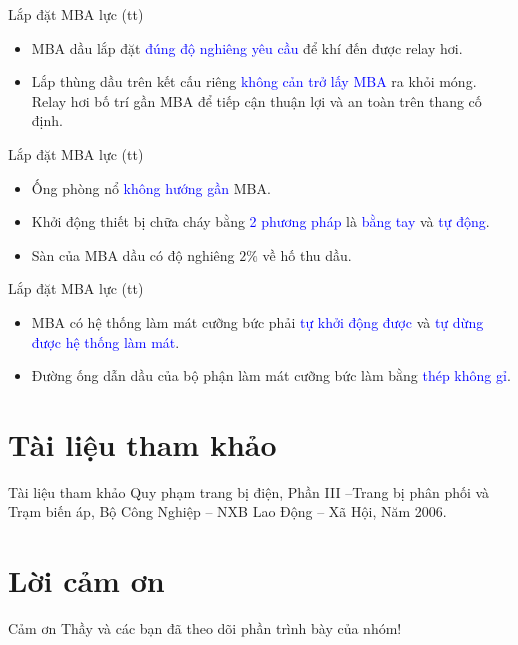 \documentclass[20pt]{beamer}
\newcommand{\noibat}[1]{\textcolor{blue}{#1}} %
\begin{document}
\begin{frame}{Lắp đặt MBA lực (tt)}
	\begin{itemize}
	\justifying
		\item \alert{MBA dầu} lắp đặt \noibat{đúng độ nghiêng yêu cầu} để khí đến được relay hơi.
		\item \alert{Lắp thùng dầu} trên \alert{kết cấu riêng} \noibat{không cản trở lấy MBA} ra khỏi móng. \alert{Relay hơi} bố trí gần MBA để tiếp cận thuận lợi và an toàn trên thang cố định.
	\end{itemize}
\end{frame}

\begin{frame}{Lắp đặt MBA lực (tt)}
	\begin{itemize}
	\justifying
		\item \alert{Ống phòng nổ} \noibat{không hướng gần} MBA.
		\item \alert{Khởi động thiết bị chữa cháy} bằng  \noibat{2 phương pháp} là \noibat{bằng tay} và \noibat{tự động}.
		\item Sàn của MBA dầu có độ nghiêng $2\%$ về hố thu dầu.
	\end{itemize}
\end{frame}

\begin{frame}{Lắp đặt MBA lực (tt)}
	\begin{itemize}
	\justifying
		\item MBA có \alert{hệ thống làm mát cưỡng bức} phải \noibat{tự khởi động được} và \noibat{tự dừng được hệ thống làm mát}.
		\item \alert{Đường ống dẫn dầu của bộ phận làm mát cưỡng bức} làm bằng \noibat{thép không gỉ}.
	\end{itemize}
\end{frame}

\section*{Tài liệu tham khảo}
\begin{frame}{Tài liệu tham khảo}
\justifying
\hspace{1cm} \alert{Quy phạm trang bị điện, Phần III --Trang bị phân phối và Trạm biến áp}, Bộ Công Nghiệp -- NXB Lao Động -- Xã Hội, Năm 2006.
\end{frame}

\section*{Lời cảm ơn}
\begin{frame}
\justifying
\Large \alert{Cảm ơn Thầy và các bạn đã theo dõi phần trình bày của nhóm!}
\end{frame}
\end{document}
